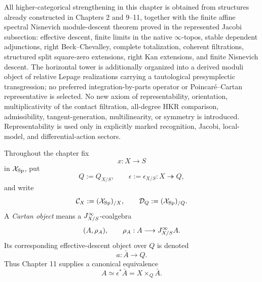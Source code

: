 All higher-categorical strengthening in this chapter is obtained from structures already constructed in Chapters 2 and 9--11, together with the finite affine spectral Nisnevich module-descent theorem proved in the represented Jacobi subsection: effective descent, finite limits in the native \(\infty\)-topos, stable dependent adjunctions, right Beck--Chevalley, complete totalization, coherent filtrations, structured split square-zero extensions, right Kan extensions, and finite Nisnevich descent. The horizontal tower is additionally organized into a derived moduli object of relative Lepage realizations carrying a tautological presymplectic transgression; no preferred integration-by-parts operator or Poincar\'e--Cartan representative is selected. No new axiom of representability, orientation, multiplicativity of the contact filtration, all-degree HKR comparison, admissibility, tangent-generation, multilinearity, or symmetry is introduced. Representability is used only in explicitly marked recognition, Jacobi, local-model, and differential-action sectors.

\begin{convention}
\label{conv:var-ambient}
Throughout the chapter fix
\[
    x:X\longrightarrow S
\]
in \(\mathcal{X}_{\mathrm{Sp}}\), put
\[
    Q:=Q_{X/S},
    \qquad
    \epsilon:=\epsilon_{X/S}:X\twoheadrightarrow Q,
\]
and write
\[
    \mathcal C_X:=(\mathcal{X}_{\mathrm{Sp}})_{/X},
    \qquad
    \mathcal D_Q:=(\mathcal{X}_{\mathrm{Sp}})_{/Q}.
\]
A \emph{Cartan object} means a \(J^{\infty}_{X/S}\)-coalgebra
\[
    (A,\rho_A),
    \qquad
    \rho_A:A\longrightarrow J^{\infty}_{X/S}A.
\]
Its corresponding effective-descent object over \(Q\) is denoted
\[
    a:\bar A\longrightarrow Q.
\]
Thus Chapter 11 supplies a canonical equivalence
\[
    A\simeq\epsilon^*\bar A=X\times_Q\bar A.
\]
\end{convention}

